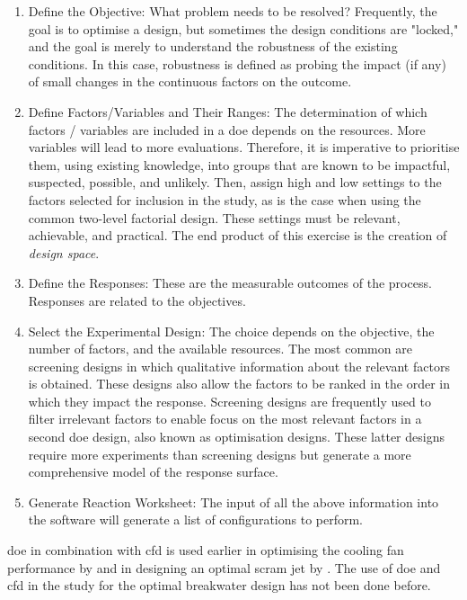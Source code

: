 \begin{enumerate}
    \item Define the Objective: What problem needs to be resolved? Frequently, the goal is to optimise a design, but sometimes the design conditions are "locked," and the goal is merely to understand the robustness of the existing conditions. In this case, robustness is defined as probing the impact (if any) of small changes in the continuous factors on the outcome.
    
    \item Define Factors/Variables and Their Ranges: The determination of which factors / variables are included in a \acrshort{doe} depends on the resources. More variables will lead to more evaluations. Therefore, it is imperative to prioritise them, using existing knowledge, into groups that are known to be impactful, suspected, possible, and unlikely. Then, assign high and low settings to the factors selected for inclusion in the study, as is the case when using the common two-level factorial design. These settings must be relevant, achievable, and practical. The end product of this exercise is the creation of \textit{design space}.
    
    \item Define the Responses: These are the measurable outcomes of the process. Responses are related to the objectives. 
    
    \item Select the Experimental Design: The choice depends on the objective, the number of factors, and the available resources. The most common are screening designs in which qualitative information about the relevant factors is obtained. These designs also allow the factors to be ranked in the order in which they impact the response. Screening designs are frequently used to filter irrelevant factors to enable focus on the most relevant factors in a second \acrshort{doe} design, also known as optimisation designs. These latter designs require more experiments than screening designs but generate a more comprehensive model of the response surface. 
    
    \item Generate Reaction Worksheet: The input of all the above information into the software will generate a list of configurations to perform.

\end{enumerate}

\acrshort{doe} in combination with \acrshort{cfd} is used earlier in optimising the cooling fan performance by \citet{Hagenmaier2002} and in designing an optimal scram jet by \citet{Srinivasa2014}. The use of \acrshort{doe} and \acrshort{cfd} in the study for the optimal breakwater design has not been done before.



